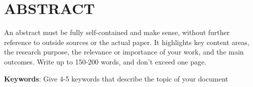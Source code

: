 \chapter{ABSTRACT}\label{abstract}
\onehalfspacing
An abstract must be fully self-contained and make sense, without further reference to outside sources or the actual paper. It highlights key content areas, the research purpose, the relevance or importance of your work, and the main outcomes. 
Write up to 150-200 words, and don't exceed one page.

               
\textbf{Keywords}: Give 4-5 keywords that describe the topic of your document

\newpage